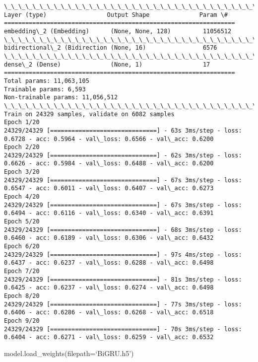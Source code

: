 \documentclass[11pt]{article}
\begin{document}
    \begin{Verbatim}[commandchars=\\\{\}]
\_\_\_\_\_\_\_\_\_\_\_\_\_\_\_\_\_\_\_\_\_\_\_\_\_\_\_\_\_\_\_\_\_\_\_\_\_\_\_\_\_\_\_\_\_\_\_\_\_\_\_\_\_\_\_\_\_\_\_\_\_\_\_\_\_
Layer (type)                 Output Shape              Param \#   
=================================================================
embedding\_2 (Embedding)      (None, None, 128)         11056512  
\_\_\_\_\_\_\_\_\_\_\_\_\_\_\_\_\_\_\_\_\_\_\_\_\_\_\_\_\_\_\_\_\_\_\_\_\_\_\_\_\_\_\_\_\_\_\_\_\_\_\_\_\_\_\_\_\_\_\_\_\_\_\_\_\_
bidirectional\_2 (Bidirection (None, 16)                6576      
\_\_\_\_\_\_\_\_\_\_\_\_\_\_\_\_\_\_\_\_\_\_\_\_\_\_\_\_\_\_\_\_\_\_\_\_\_\_\_\_\_\_\_\_\_\_\_\_\_\_\_\_\_\_\_\_\_\_\_\_\_\_\_\_\_
dense\_2 (Dense)              (None, 1)                 17        
=================================================================
Total params: 11,063,105
Trainable params: 6,593
Non-trainable params: 11,056,512
\_\_\_\_\_\_\_\_\_\_\_\_\_\_\_\_\_\_\_\_\_\_\_\_\_\_\_\_\_\_\_\_\_\_\_\_\_\_\_\_\_\_\_\_\_\_\_\_\_\_\_\_\_\_\_\_\_\_\_\_\_\_\_\_\_
Train on 24329 samples, validate on 6082 samples
Epoch 1/20
24329/24329 [==============================] - 63s 3ms/step - loss: 0.6728 - acc: 0.5964 - val\_loss: 0.6566 - val\_acc: 0.6200
Epoch 2/20
24329/24329 [==============================] - 62s 3ms/step - loss: 0.6626 - acc: 0.5984 - val\_loss: 0.6488 - val\_acc: 0.6200
Epoch 3/20
24329/24329 [==============================] - 67s 3ms/step - loss: 0.6547 - acc: 0.6011 - val\_loss: 0.6407 - val\_acc: 0.6273
Epoch 4/20
24329/24329 [==============================] - 67s 3ms/step - loss: 0.6494 - acc: 0.6116 - val\_loss: 0.6340 - val\_acc: 0.6391
Epoch 5/20
24329/24329 [==============================] - 68s 3ms/step - loss: 0.6460 - acc: 0.6189 - val\_loss: 0.6306 - val\_acc: 0.6432
Epoch 6/20
24329/24329 [==============================] - 97s 4ms/step - loss: 0.6437 - acc: 0.6237 - val\_loss: 0.6288 - val\_acc: 0.6498
Epoch 7/20
24329/24329 [==============================] - 81s 3ms/step - loss: 0.6425 - acc: 0.6237 - val\_loss: 0.6274 - val\_acc: 0.6498
Epoch 8/20
24329/24329 [==============================] - 77s 3ms/step - loss: 0.6406 - acc: 0.6286 - val\_loss: 0.6268 - val\_acc: 0.6518
Epoch 9/20
24329/24329 [==============================] - 70s 3ms/step - loss: 0.6404 - acc: 0.6271 - val\_loss: 0.6259 - val\_acc: 0.6532

    \end{Verbatim}

    model.load\_weights(filepath=`BiGRU.h5')
\end{document}
